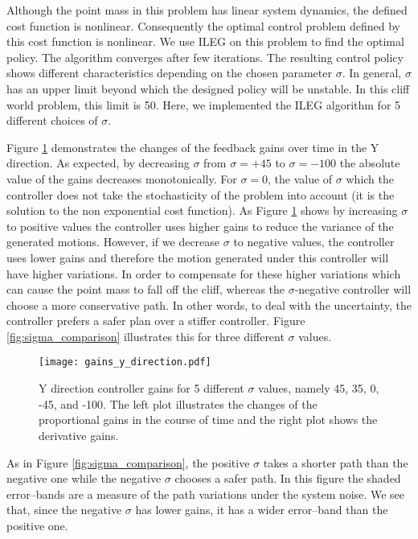 \documentclass[letterpaper, 10 pt, conference]{ieeeconf}
\begin{document}
Although the point mass in this problem has linear system dynamics, the defined
cost function is nonlinear. Consequently the optimal control problem defined by
this cost function is nonlinear. We use ILEG on this problem to find the optimal
policy. The algorithm converges after few iterations. The resulting control
policy shows different characteristics depending on the chosen parameter 
$\sigma$. In general, $\sigma$ has an upper limit beyond which the designed
policy will be unstable. In this cliff world problem, this limit is 50. Here, we
implemented the ILEG algorithm for 5 different choices of $\sigma$.

Figure \ref{fig:gains_y_direction} demonstrates the changes of the feedback gains
over time in the Y direction. As expected, by decreasing $\sigma$ from
$\sigma=+45$ to $\sigma=-100$ the absolute value of the gains decreases
monotonically. For $\sigma=0$, the value of $\sigma$ which the controller does
not take the stochasticity of the problem into account (it is the solution to the
non exponential cost function). As Figure \ref{fig:gains_y_direction} shows by
increasing $\sigma$ to positive values the controller uses higher gains to reduce
the variance of the generated motions. However, if we decrease $\sigma$ to
negative values, the controller uses lower gains and therefore the motion
generated under this controller will have higher variations. In order to
compensate for these higher variations which can cause the point mass to fall off
the cliff, whereas the $\sigma$-negative controller will choose a more
conservative path. In other words, to deal with the uncertainty, the controller
prefers a safer plan over a stiffer controller. Figure \ref{fig:sigma_comparison}
illustrates this for three different $\sigma$ values.

\begin{figure} [tpb]
\centering
\texttt{[image: gains\_y\_direction.pdf]}
\caption{Y direction controller gains for 5 different $\sigma$ values, namely 45, 35, 0, -45, and -100. The left plot illustrates the changes of the proportional gains in the course of time and the right plot shows the derivative gains.}
\label{fig:gains_y_direction}
\end{figure}

As in Figure \ref{fig:sigma_comparison}, the positive $\sigma$ takes a shorter
path than the negative one while the negative $\sigma$ chooses a safer path. In
this figure the shaded error--bands are a measure of the path variations under the
system noise. We see that, since the negative $\sigma$ has lower gains, it has a
wider error--band than the positive one.
\end{document}
